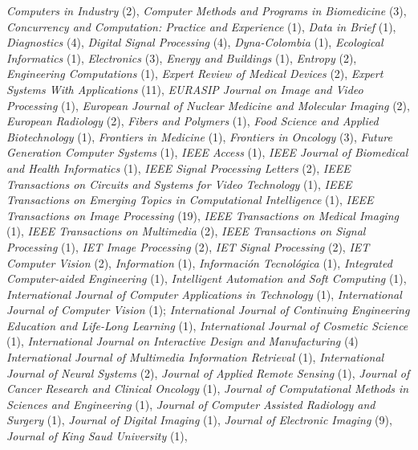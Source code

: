 \documentclass[11pt]{article}
\begin{document}
\begin{itemize}
    \emph{Computers in Industry} (2),
    \emph{Computer Methods and Programs in Biomedicine} (3),
    \emph{Concurrency and Computation: Practice and Experience} (1),
		\emph{Data in Brief} (1),
    \emph{Diagnostics} (4),
    \emph{Digital Signal Processing} (4),
    \emph{Dyna-Colombia} (1),
    \emph{Ecological Informatics} (1),
    \emph{Electronics} (3),
    \emph{Energy and Buildings} (1),
    \emph{Entropy} (2),
    \emph{Engineering Computations} (1),
		\emph{Expert Review of Medical Devices} (2),
    \emph{Expert Systems With Applications} (11),
		\emph{EURASIP Journal on Image and Video Processing} (1),
		\emph{European Journal of Nuclear Medicine and Molecular Imaging} (2),
    \emph{European Radiology} (2),
    \emph{Fibers and Polymers} (1),
    \emph{Food Science and Applied Biotechnology} (1),
    \emph{Frontiers in Medicine} (1),
		\emph{Frontiers in Oncology} (3),
    \emph{Future Generation Computer Systems} (1),
		\emph{IEEE Access} (1),
    \emph{IEEE Journal of Biomedical and Health Informatics} (1),
    \emph{IEEE Signal Processing Letters} (2),
    \emph{IEEE Transactions on Circuits and Systems for Video Technology} (1),
    \emph{IEEE Transactions on Emerging Topics in Computational Intelligence} (1),
    \emph{IEEE Transactions on Image Processing} (19),
    \emph{IEEE Transactions on Medical Imaging} (1),
    \emph{IEEE Transactions on Multimedia} (2),
    \emph{IEEE Transactions on Signal Processing} (1),
    \emph{IET Image Processing} (2),
    \emph{IET Signal Processing} (2),
    \emph{IET Computer Vision} (2),
    \emph{Information} (1),
    \emph{Información Tecnológica} (1),
    \emph{Integrated Computer-aided Engineering} (1),
    \emph{Intelligent Automation and Soft Computing} (1),
    \emph{International Journal of Computer Applications in Technology} (1),
		\emph{International Journal of Computer Vision} (1);
    \emph{International  Journal  of Continuing  Engineering  Education and  Life-Long Learning} (1),
    \emph{International Journal of Cosmetic Science} (1),
		\emph{International Journal on Interactive Design and Manufacturing} (4)
    \emph{International Journal of Multimedia Information Retrieval} (1),
    \emph{International Journal of Neural Systems} (2),
    \emph{Journal of Applied Remote Sensing} (1),
    \emph{Journal of Cancer Research and Clinical Oncology} (1),
    \emph{Journal of Computational Methods in Sciences and Engineering} (1),
		\emph{Journal of Computer Assisted Radiology and Surgery} (1),
		\emph{Journal of Digital Imaging} (1),
    \emph{Journal of Electronic Imaging} (9),
		\emph{Journal of King Saud University} (1),

\end{itemize}
\end{document}
